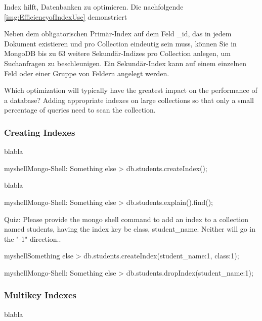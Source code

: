 Index hilft, Datenbanken zu optimieren. Die nachfolgende \autoref{img:EfficiencyofIndexUse} demonstriert

Neben dem obligatorischen Primär-Index auf dem Feld \_id, das in jedem Dokument existieren und pro Collection eindeutig sein muss, können Sie in MongoDB bis zu 63 weitere Sekundär-Indizes pro Collection anlegen, um Suchanfragen zu beschleunigen. Ein Sekundär-Index kann auf einem einzelnen Feld oder einer Gruppe von Feldern angelegt werden.%

Which optimization will typically have the greatest impact on the performance of a database?\newline
Adding appropriate indexes on large collections so that only a small percentage of queries need to scan the collection.

\subsubsection{Creating Indexes}
blabla

\begin{listingsboxShell}[label={lst:X}]{myshell}{Mongo-Shell: Something else}
> db.students.createIndex();
\end{listingsboxShell}

blabla

\begin{listingsboxShell}[label={lst:X}]{myshell}{Mongo-Shell: Something else}
> db.students.explain().find();
\end{listingsboxShell}

Quiz: Please provide the mongo shell command to add an index to a collection named students, having the index key be class, student\_name.
Neither will go in the "-1" direction..

\begin{listingsboxShell}[label={lst:X}]{myshell}{Something else}
> db.students.createIndex({student\_name:1, class:1});
\end{listingsboxShell}

\begin{listingsboxShell}[label={lst:X}]{myshell}{Mongo-Shell: Something else}
> db.students.dropIndex({student_name:1});
\end{listingsboxShell}

\subsubsection{Multikey Indexes}
blabla
